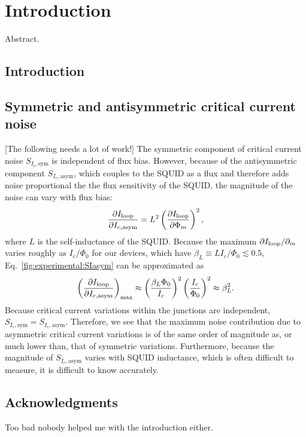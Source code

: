 \chapter{Introduction}
\label{chap.intro}

Abstract.

\section{Introduction}



\section{Symmetric and antisymmetric critical current noise}

[The following needs a lot of work!] The symmetric component of critical current noise $S_{I_c,\text{sym}}$ is independent of flux bias. However, because of the antisymmetric component $S_{I_c,\text{asym}}$, which couples to the SQUID as a flux and therefore adds noise proportional the the flux sensitivity of the SQUID, the magnitude of the noise can vary with flux bias:
\begin{align}\label{fig:experimental:SIasym}
\frac{\partial\Iloop}{\partial I_{c,\text{asym}}} = L^2 %
\left(\frac{\partial \Iloop}{\partial \Phi_m}\right)^2,
\end{align}
where $L$ is the self-inductance of the SQUID. Because the maximum $\partial I_\text{loop}/\partial_m$ varies roughly as $I_c/\Phi_0$ for our devices, which have $\beta_L \equiv LI_c/\Phi_0 \lesssim 0.5$, Eq.~\eqref{fig:experimental:SIasym} can be approximated as
\begin{align}\label{fig:experimental:SIasym}
\left(\frac{\partial\Iloop}{\partial I_{c,\text{asym}}}\right)_{\text{max}} \approx %
\left(\frac{\beta_L\Phi_0}{I_c}\right)^2 %
\left(\frac{I_c}{\Phi_0}\right)^2 %
\approx \beta_L^2.
\end{align}
Because critical current variations within the junctions are independent, $S_{I_c,\text{sym}} = S_{I_c,\text{asym}}$. Therefore, we see that the maximum noise contribution due to asymmetric critical current variations is of the same order of magnitude as, or much lower than, that of symmetric variations. Furthermore, because the magnitude of $S_{I_c,\text{asym}}$ varies with SQUID inductance, which is often difficult to measure, it is difficult to know accurately.

\section*{Acknowledgments}

Too bad nobody helped me with the introduction either.
